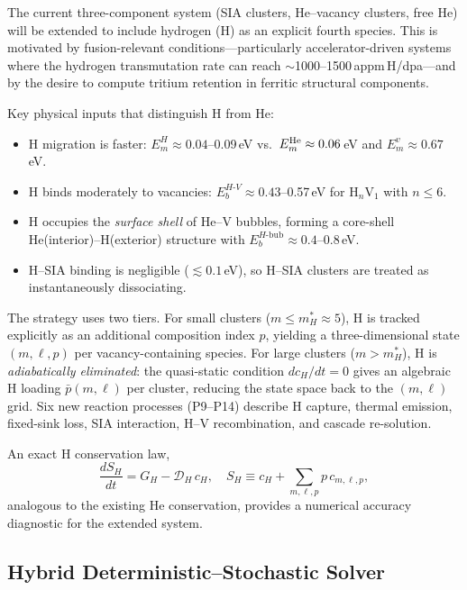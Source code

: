 \documentclass[12pt,letterpaper]{article}
\begin{document}
The current three-component system (SIA clusters, He--vacancy clusters,
free He) will be extended to include hydrogen (H) as an explicit fourth
species.  This is motivated by fusion-relevant conditions---particularly
accelerator-driven systems where the hydrogen transmutation rate can reach
$\sim$1000--1500\,appm\,H/dpa---and by the desire to compute tritium
retention in ferritic structural components.

Key physical inputs that distinguish H from He:
\begin{itemize}
  \item H migration is faster: $E_m^H \approx 0.04$--0.09\,eV vs.\
    $E_m^{\rm He} \approx 0.06\,$eV and $E_m^v \approx 0.67\,$eV.
  \item H binds moderately to vacancies:
    $E_b^{H\text{-}V} \approx 0.43$--0.57\,eV for H$_n$V$_1$
    with $n \leq 6$.
  \item H occupies the \emph{surface shell} of He--V bubbles, forming a
    core-shell He(interior)--H(exterior) structure with
    $E_b^{H\text{-bub}} \approx 0.4$--0.8\,eV.
  \item H--SIA binding is negligible ($\lesssim 0.1$\,eV), so H--SIA
    clusters are treated as instantaneously dissociating.
\end{itemize}

The strategy uses two tiers.  For small clusters ($m \leq m_H^*\approx 5$),
H is tracked explicitly as an additional composition index $p$, yielding
a three-dimensional state $(m,\ell,p)$ per vacancy-containing species.
For large clusters ($m > m_H^*$), H is \emph{adiabatically eliminated}:
the quasi-static condition $dc_H/dt = 0$ gives an algebraic H loading
$\bar{p}(m,\ell)$ per cluster, reducing the state space back to the
$(m,\ell)$ grid.  Six new reaction processes (P9--P14) describe H
capture, thermal emission, fixed-sink loss, SIA interaction, H--V
recombination, and cascade re-solution.

An exact H conservation law,
\begin{equation}
  \frac{dS_H}{dt} = G_H - \mathcal{D}_H\,c_H,
  \quad
  S_H \equiv c_H + \sum_{m,\ell,p} p\,c_{m,\ell,p},
\end{equation}
analogous to the existing He conservation, provides a numerical
accuracy diagnostic for the extended system.

\subsection{Hybrid Deterministic--Stochastic Solver}
\label{sec:plan_hybrid}
\end{document}
